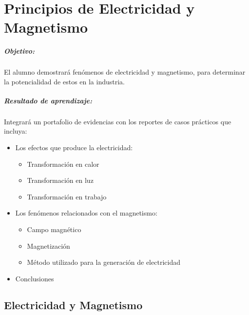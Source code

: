 \chapter{Principios de Electricidad y Magnetismo}
\paragraph{Objetivo:}
El alumno demostrará fenómenos de electricidad y magnetismo,
para determinar la potencialidad de estos en la industria.

\paragraph{Resultado de aprendizaje:}
Integrará un portafolio de evidencias con los reportes de casos prácticos que incluya: 
\begin{itemize}
	\item Los efectos que produce la electricidad:
	\begin{itemize}
		\item Transformación en calor
		\item Transformación en luz
		\item Transformación en trabajo
	\end{itemize}
	\item Los fenómenos relacionados con el magnetismo:
	\begin{itemize}
		\item Campo magnético
		\item Magnetización
		\item Método utilizado para la generación de electricidad
	\end{itemize}
	\item Conclusiones
\end{itemize}
 
\section{Electricidad y Magnetismo}
